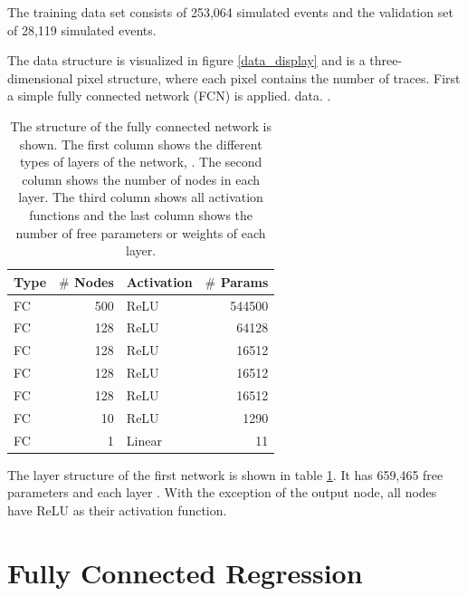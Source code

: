 \documentclass[12pt, a4paper]{thesis}
\begin{document}
The training data set consists of 253,064 simulated events and the
validation set of 28,119 simulated events.

The data structure is visualized in figure \ref{data_display} and is a
three-dimensional pixel structure, where each pixel contains the
number of traces. First a simple fully connected network (FCN) is
applied. %
data.  .

\begin{table}[H]
  \centering
  \begin{tabular}{lrlr}
    Type & \(\#\) Nodes & Activation & \(\#\) Params\\
    \hline
    FC & 500 & ReLU & 544500\\
    FC & 128 & ReLU & 64128\\
    FC & 128 & ReLU & 16512\\
    FC & 128 & ReLU & 16512\\
    FC & 128 & ReLU & 16512\\
    FC & 10 & ReLU & 1290\\
    FC & 1 & Linear & 11\\
  \end{tabular}
  \caption{The structure of the fully connected network is shown. The
    first column shows the different types of layers of the network,
    . The second column shows the number of nodes in each
    layer. The third column shows all activation functions and the
    last column shows the number of free parameters or weights of each
    layer.}
  \label{fcn_structure}
\end{table}

The layer structure of the first network is shown in table
\ref{fcn_structure}.   It has
659,465 free parameters and each layer . With the exception of the output node, all
nodes have ReLU as their activation function. 

\section{Fully Connected Regression}
\label{sec:orgdf3234b}
\end{document}

